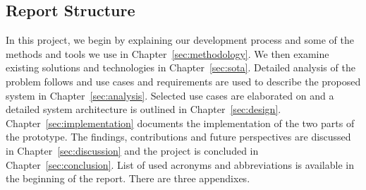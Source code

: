 \subsection{Report Structure}

In this project, we begin by explaining our development process and some of the methods and tools we use in Chapter~\ref{sec:methodology}. We then examine existing solutions and technologies in Chapter~\ref{sec:sota}. Detailed analysis of the problem follows and use cases and requirements are used to describe the proposed system in Chapter~\ref{sec:analysis}. Selected use cases are elaborated on and a detailed system architecture is outlined in Chapter~\ref{sec:design}. Chapter~\ref{sec:implementation} documents the implementation of the two parts of the prototype. The findings, contributions and future perspectives are discussed in Chapter~\ref{sec:discussion} and the project is concluded in Chapter~\ref{sec:conclusion}. List of used acronyms and abbreviations is available in the beginning of the report. There are three appendixes.